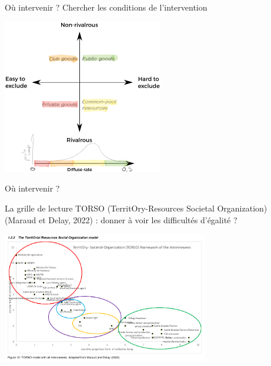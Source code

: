 \documentclass[newPxFont]{beamer}
\begin{document}
\begin{frame}[c]{Où intervenir ?}
  \vspace{-1cm}
  Chercher les conditions de l'intervention
  \begin{center}
  \includegraphics[width=7cm]{img/matrix_commons-proj42.pdf}
  \end{center}
\end{frame}

\begin{frame}[c]{Où intervenir ?}
    \vspace{-1cm}

   La grille de lecture TORSO (TerritOry-Resources Societal Organization) (Maraud et Delay, 2022) : donner à voir les difficultés d'égalité ?
  \begin{center}
   \includegraphics[width=9cm]{img/torso_mathilde.png}
  \end{center}

\end{frame}
\end{document}
